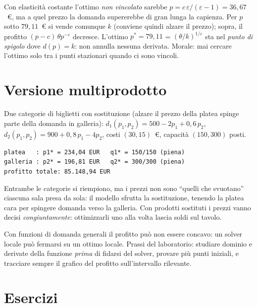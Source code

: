 \begin{spiegazione}
Con elasticità costante l'ottimo \emph{non vincolato} sarebbe
$p = c\,\varepsilon/(\varepsilon - 1) = 36{,}67$~\euro, ma a quel prezzo la domanda
supererebbe di gran lunga la capienza. Per $p$ sotto $79{,}11$~\euro{} si vende
comunque $k$ (conviene quindi alzare il prezzo); sopra, il profitto
$(p - c)\,\theta p^{-\varepsilon}$ decresce. L'ottimo $p^* = 79{,}11$ =
$(\theta/k)^{1/\varepsilon}$ sta nel \emph{punto di spigolo} dove $d(p) = k$: non annulla
nessuna derivata. Morale: mai cercare l'ottimo solo tra i punti stazionari quando ci
sono vincoli.
\end{spiegazione}

\section{Versione multiprodotto}

Due categorie di biglietti con sostituzione (alzare il prezzo della platea spinge
parte della domanda in galleria): $d_1(p_1, p_2) = 500 - 2p_1 + 0{,}6\,p_2$,
$d_2(p_1, p_2) = 900 + 0{,}8\,p_1 - 4p_2$, costi $(30, 15)$~\euro, capacità $(150, 300)$ posti.

\begin{lstlisting}[style=output]
platea   : p1* = 234,04 EUR   q1* = 150/150 (piena)
galleria : p2* = 196,81 EUR   q2* = 300/300 (piena)
profitto totale: 85.148,94 EUR
\end{lstlisting}

\begin{insight}
Entrambe le categorie si riempiono, ma i prezzi non sono ``quelli che svuotano''
ciascuna sala presa da sola: il modello sfrutta la sostituzione, tenendo la platea
cara per spingere domanda verso la galleria. Con prodotti sostituti i prezzi vanno
decisi \emph{congiuntamente}: ottimizzarli uno alla volta lascia soldi sul tavolo.
\end{insight}

\begin{attenzione}
Con funzioni di domanda generali il profitto può non essere concavo: un solver locale
può fermarsi su un ottimo locale. Prassi del laboratorio: studiare dominio e derivate
della funzione \emph{prima} di fidarsi del solver, provare più punti iniziali, e
tracciare sempre il grafico del profitto sull'intervallo rilevante.
\end{attenzione}

\section{Esercizi}

